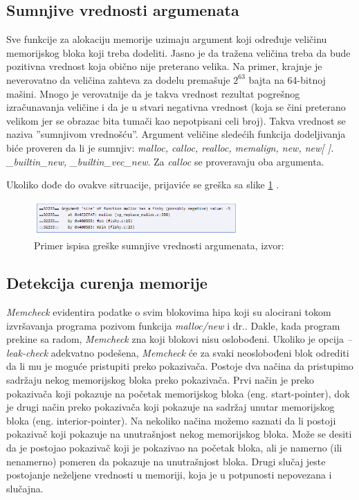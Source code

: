 \documentclass[12pt,oneside]{memoir}
\theoremstyle{plain}
\theoremstyle{definition}
\begin{document}
\subsection{Sumnjive vrednosti argumenata}
Sve funkcije za alokaciju memorije uzimaju argument koji određuje veličinu memorijskog bloka koji treba dodeliti. Jasno je da tražena veličina treba da bude pozitivna vrednost koja obično nije preterano velika. Na primer, krajnje je neverovatno da veličina zahteva za dodelu premašuje ${2}^{63}$ bajta na 64-bitnoj mašini. Mnogo je verovatnije da je takva vrednost rezultat pogrešnog izračunavanja veličine i da je u stvari negativna vrednost (koja se čini preterano velikom jer se obrazac bita tumači kao nepotpisani celi broj). Takva vrednost se naziva ''sumnjivom vrednošću''. Argument veličine sledećih funkcija dodeljivanja biće proveren da li je sumnjiv: \textit{malloc, calloc, realloc, memalign, new, new[ ]. \_builtin\_new, \_builtin\_vec\_new}. Za \textit{calloc} se proveravaju oba argumenta.

Ukoliko dođe do ovakve sitruacije, prijaviće se greška sa slike \ref{fig:slika2.11} \cite{Memcheck}. 
\begin{figure}[!ht]
  \centering
  \includegraphics[width=0.7\textwidth]{fishyArgument.png}
  \caption{Primer ispisa greške sumnjive vrednosti argumenata, izvor: \cite{Memcheck}}
  \label{fig:slika2.11}
\end{figure}

\subsection{Detekcija curenja memorije}
\textit{Memcheck} evidentira podatke o svim blokovima hipa koji su alocirani tokom izvršavanja programa pozivom funkcija \textit{malloc/new} i dr.. Dakle, kada program prekine sa radom, \textit{Memcheck} zna koji blokovi nisu oslobođeni. Ukoliko je opcija \textit{--leak-check}  adekvatno podešena, \textit{Memcheck} će za svaki neoslobođeni blok odrediti da li mu je moguće pristupiti preko pokazivača. 
Postoje dva načina da pristupimo sadržaju nekog memorijskog bloka preko pokazivača. Prvi način je preko pokazivača koji pokazuje na početak memorijskog bloka (eng. start-pointer), dok je drugi način preko pokazivača koji pokazuje na sadržaj unutar memorijskog bloka (eng. interior-pointer). Na nekoliko načina možemo saznati da li postoji pokazivač koji pokazuje na unutrašnjost nekog memorijskog bloka. Može se desiti da je postojao pokazivač koji je pokazivao na početak bloka, ali je namerno (ili nenamerno) pomeren da pokazuje na unutrašnjost bloka. Drugi slučaj jeste postojanje neželjene vrednosti u memoriji, koja je u potpunosti nepovezana i slučajna.
\end{document}
